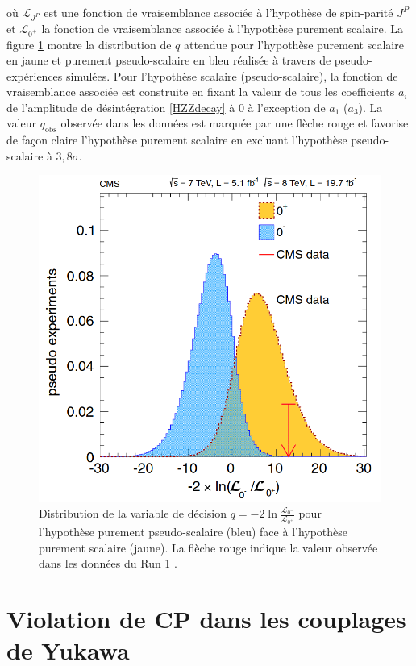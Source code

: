 où $\mathcal{L}_{J^P}$ est une fonction de vraisemblance associée à l'hypothèse de spin-parité $J^P$ et $\mathcal{L}_{0^+}$ la fonction de vraisemblance associée à l'hypothèse purement scalaire. La figure \ref{statTest} montre la distribution de $q$ attendue pour l'hypothèse purement scalaire en jaune et purement pseudo-scalaire en bleu réalisée à travers de pseudo-expériences simulées. Pour l'hypothèse scalaire (pseudo-scalaire), la fonction de vraisemblance associée est construite en fixant la valeur de tous les coefficients $a_i$ de l'amplitude de désintégration \ref{HZZdecay} à $0$ à l'exception de $a_1$ ($a_3$). La valeur $q_{\text{obs}}$ observée dans les données est marquée par une flèche rouge et favorise de façon claire l'hypothèse purement scalaire en excluant l'hypothèse pseudo-scalaire à $3,8\sigma$.  

\begin{figure}
\centering
    \includegraphics[scale=0.3]{Chapitre5/Images/testStat.png} 
    \caption{Distribution de la variable de décision $q=-2\ln \frac{\mathcal{L}_{0^-}}{\mathcal{L}_{0^+}}$ pour l'hypothèse purement pseudo-scalaire (bleu) face à l'hypothèse purement scalaire (jaune). La flèche rouge indique la valeur observée dans les données du Run 1 \cite{Z4lCP}.}
    \label{statTest}
\end{figure}

\section{Violation de CP dans les couplages de Yukawa}

